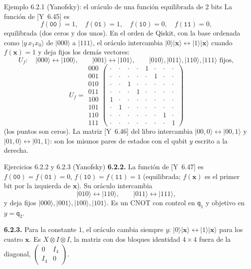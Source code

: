 \documentclass[11pt, a4paper, twoside, openright]{report}
\providecommand{\ket}[1]{|#1\rangle}
\newcommand{\bx}{\mathbf{x}}
\newcommand{\Yan}[1]{\textcolor{rosaviejo}{\small[Y~#1]}}  %
\begin{document}
\begin{ejemplo}{Ejemplo 6.2.1 (Yanofsky): el oráculo de una función equilibrada de 2 bits}
La función de \Yan{6.45} es
\[ f(\texttt{00}) = 1, \quad f(\texttt{01}) = 1, \quad f(\texttt{10}) = 0, \quad f(\texttt{11}) = 0, \]
equilibrada (dos ceros y dos unos). En el orden de Qiskit, con la base ordenada como $\ket{y\,x_1x_0}$ de $\ket{000}$ a $\ket{111}$, el oráculo intercambia $\ket{0}\ket{\bx}\leftrightarrow\ket{1}\ket{\bx}$ cuando $f(\bx) = 1$ y deja fijos los demás vectores:
\[
U_f:\quad \ket{000}\leftrightarrow\ket{100}, \qquad \ket{001}\leftrightarrow\ket{101}, \qquad \ket{010}, \ket{011}, \ket{110}, \ket{111} \text{ fijos},
\]
\[
U_f = \begin{array}{c} \scriptstyle 000\\ \scriptstyle 001\\ \scriptstyle 010\\ \scriptstyle 011\\ \scriptstyle 100\\ \scriptstyle 101\\ \scriptstyle 110\\ \scriptstyle 111 \end{array}
\!\!\begin{pmatrix}
\cdot&\cdot&\cdot&\cdot&1&\cdot&\cdot&\cdot\\
\cdot&\cdot&\cdot&\cdot&\cdot&1&\cdot&\cdot\\
\cdot&\cdot&1&\cdot&\cdot&\cdot&\cdot&\cdot\\
\cdot&\cdot&\cdot&1&\cdot&\cdot&\cdot&\cdot\\
1&\cdot&\cdot&\cdot&\cdot&\cdot&\cdot&\cdot\\
\cdot&1&\cdot&\cdot&\cdot&\cdot&\cdot&\cdot\\
\cdot&\cdot&\cdot&\cdot&\cdot&\cdot&1&\cdot\\
\cdot&\cdot&\cdot&\cdot&\cdot&\cdot&\cdot&1
\end{pmatrix}
\]
(los puntos son ceros). La matriz \Yan{6.46} del libro intercambia $\ket{00,0}\leftrightarrow\ket{00,1}$ y $\ket{01,0}\leftrightarrow\ket{01,1}$: son los mismos pares de estados con el qubit $y$ escrito a la derecha.
\end{ejemplo}

\begin{ejercicio}{Ejercicios 6.2.2 y 6.2.3 (Yanofsky)}
\textbf{6.2.2.} La función de \Yan{6.47} es $f(\texttt{00}) = f(\texttt{01}) = 0$, $f(\texttt{10}) = f(\texttt{11}) = 1$ (equilibrada; $f(\bx)$ es el primer bit por la izquierda de $\bx$). Su oráculo intercambia
\[ \ket{010}\leftrightarrow\ket{110}, \qquad \ket{011}\leftrightarrow\ket{111}, \]
y deja fijos $\ket{000}, \ket{001}, \ket{100}, \ket{101}$. Es un CNOT con control en $\mathsf{q}_1$ y objetivo en $y = \mathsf{q}_2$.

\textbf{6.2.3.} Para la constante $1$, el oráculo cambia siempre $y$: $\ket{0}\ket{\bx}\leftrightarrow\ket{1}\ket{\bx}$ para los cuatro $\bx$. Es $X\otimes I\otimes I$, la matriz con dos bloques identidad $4\times4$ fuera de la diagonal, $\left(\begin{smallmatrix} 0 & I_4\\ I_4 & 0\end{smallmatrix}\right)$.
\end{ejercicio}
\end{document}

